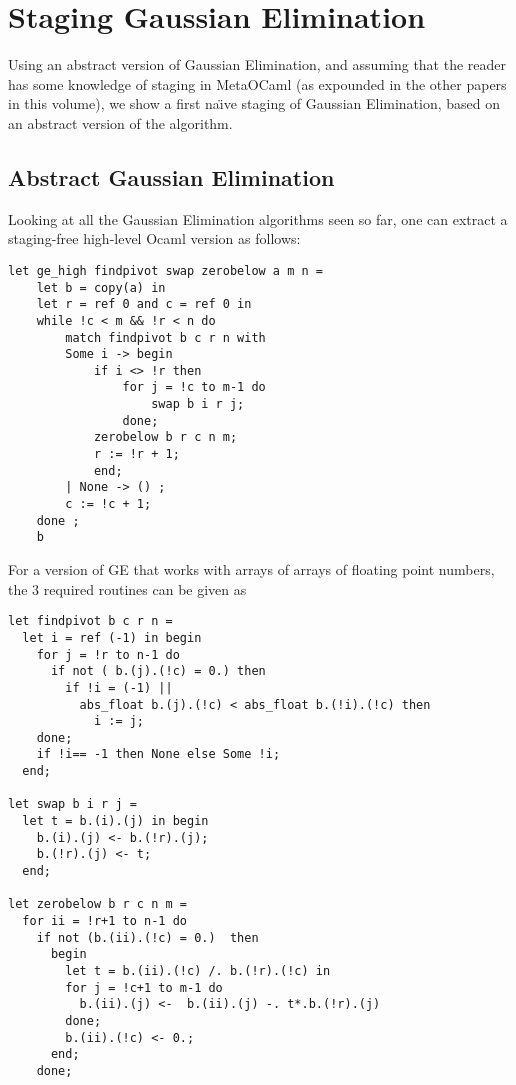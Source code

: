 \documentclass[11pt]{elsart}
\begin{document}
\section{Staging Gaussian Elimination}\label{staging}

Using an abstract version of Gaussian Elimination, and assuming that
the reader has some knowledge of staging in MetaOCaml (as expounded in
the other papers in this volume), we show a first na\"{\i}ve staging
of Gaussian Elimination, based on an abstract version of the 
algorithm.

\subsection{Abstract Gaussian Elimination}
Looking at all the Gaussian Elimination algorithms seen so far,
one can extract a staging-free high-level Ocaml version as follows:
\begin{small}
\begin{verbatim}
let ge_high findpivot swap zerobelow a m n =
    let b = copy(a) in
    let r = ref 0 and c = ref 0 in
    while !c < m && !r < n do
        match findpivot b c r n with
        Some i -> begin
            if i <> !r then
                for j = !c to m-1 do
                    swap b i r j;
                done;
            zerobelow b r c n m;
            r := !r + 1;
            end;
        | None -> () ;
        c := !c + 1;
    done ;
    b
\end{verbatim} 
\end{small}

For a version of GE that works with arrays of arrays of floating 
point numbers, the 3 required routines can be given as
\begin{small}
\begin{verbatim}
let findpivot b c r n =
  let i = ref (-1) in begin 
    for j = !r to n-1 do
      if not ( b.(j).(!c) = 0.) then 
        if !i = (-1) || 
          abs_float b.(j).(!c) < abs_float b.(!i).(!c) then
            i := j;
    done;
    if !i== -1 then None else Some !i;
  end;

let swap b i r j =
  let t = b.(i).(j) in begin
    b.(i).(j) <- b.(!r).(j);
    b.(!r).(j) <- t;
  end;

let zerobelow b r c n m = 
  for ii = !r+1 to n-1 do
    if not (b.(ii).(!c) = 0.)  then
      begin
        let t = b.(ii).(!c) /. b.(!r).(!c) in
        for j = !c+1 to m-1 do
          b.(ii).(j) <-  b.(ii).(j) -. t*.b.(!r).(j)
        done;
        b.(ii).(!c) <- 0.;
      end;
    done;
\end{verbatim}
\end{small}
\end{document}
